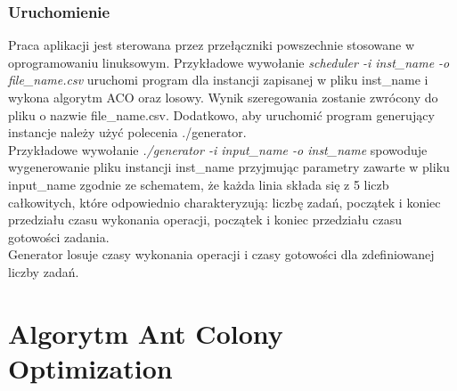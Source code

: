 \documentclass[10pt,a4paper]{article}
\begin{document}
\subsubsection{Uruchomienie}
Praca aplikacji jest sterowana przez przełączniki powszechnie stosowane w oprogramowaniu linuksowym.
Przykładowe wywołanie \textit{  scheduler -i inst\_name -o file\_name.csv} uruchomi program dla instancji zapisanej w pliku inst\_name i wykona algorytm ACO oraz losowy. Wynik szeregowania zostanie zwrócony do pliku o nazwie file\_name.csv.
Dodatkowo, aby uruchomić program generujący instancje należy użyć polecenia ./generator.\\
Przykładowe wywołanie \textit{./generator -i input\_name -o inst\_name } spowoduje wygenerowanie pliku instancji inst\_name przyjmując parametry zawarte w pliku input\_name zgodnie ze schematem, że każda linia składa się z 5 liczb całkowitych, które odpowiednio charakteryzują: liczbę zadań, początek i koniec przedziału czasu wykonania operacji, początek i koniec przedziału czasu gotowości zadania.\\
Generator losuje czasy wykonania operacji i czasy gotowości dla zdefiniowanej liczby zadań.

\section{Algorytm Ant Colony Optimization}
\end{document}
